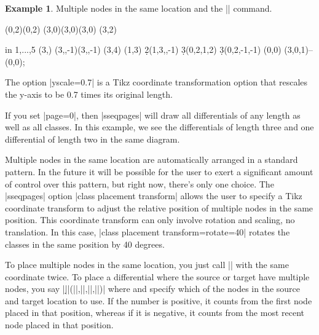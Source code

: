\documentclass[a4paper]{ltxdoc}
\theoremstyle{definition}
\newtheorem{ex}{Example}
\begin{document}
\begin{ex}
Multiple nodes in the same location and the |\structline| command.
\begin{codeexample}[]
\begin{sseqdata}[name=example4,classes={circle,fill},differentials=blue,scale=0.7]
\class(0,2)\class(0,2)
\class[red](3,0)\class[green](3,0)\class[blue](3,0)
\class(3,2)

\foreach \y in {1,...,5} {
    \class(3,\y)
    \structline(3,,-1)(3,\y,-1)
}
\class(3,4)
\class(1,3)
\d2(1,3,,-1)
\d3(0,2,1,2)
\d3(0,2,-1,-1)
\class(0,0)
\draw[->,green](3,0,1)--(0,0);
\end{sseqdata}
\printpage[name=example4,page=0]
\printpage[name=example4,page=0,class placement transform={rotate=40}]
\printpage[name=example4,page=4,class placement transform={rotate=40}]
\end{codeexample}

The option |yscale=0.7| is a Tikz coordinate transformation option that rescales the y-axis to be 0.7 times its original length.

If you set |page=0|, then |sseqpages| will draw all differentials of any length as well as all classes. In this example, we see the differentials of length three and one differential of length two in the same diagram.

Multiple nodes in the same location are automatically arranged in a standard pattern. In the future it will be possible for the user to exert a significant amount of control over this pattern, but right now, there's only one choice. The |sseqpages| option |class placement transform| allows the user to specify a Tikz coordinate transform to adjust the relative position of multiple nodes in the same position. This coordinate transform can only involve rotation and scaling, no translation. In this case, |class placement transform={rotate=40}| rotates the classes in the same position by 40 degrees. %

To place multiple nodes in the same location, you just call |\class| with the same coordinate twice. To place a differential where the source or target have multiple nodes, you say |\d||(||,||,||,||)| where  and  specify which of the nodes in the source and target location to use. If the number  is positive, it counts from the first node placed in that position, whereas if it is negative, it counts from the most recent node placed in that position.


\end{ex}
\end{document}
